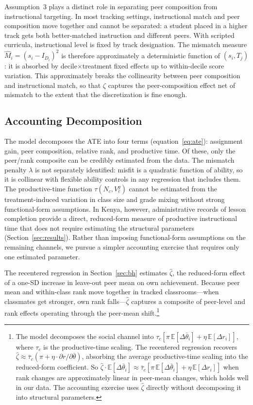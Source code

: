 \documentclass[11pt]{article}
\newcommand{\E}{\mathbb{E}}
\begin{document}
Assumption~3 plays a distinct role in separating peer composition from instructional targeting. In most tracking settings, instructional match and peer composition move together and cannot be separated: a student placed in a higher track gets both better-matched instruction and different peers. With scripted curricula, instructional level is fixed by track designation. The mismatch measure $\hat{M}_i = (s_i - I_{D_i})^2$ is therefore approximately a deterministic function of $(s_i, T_j)$: it is absorbed by decile$\times$treatment fixed effects up to within-decile score variation. This approximately breaks the collinearity between peer composition and instructional match, so that $\zeta$ captures the peer-composition effect net of mismatch to the extent that the discretization is fine enough.


\subsection{Accounting Decomposition}
\label{sec:accounting}

The model decomposes the ATE into four terms (equation~\ref{eq:ate}): assignment gain, peer composition, relative rank, and productive time. Of these, only the peer/rank composite can be credibly estimated from the data. The mismatch penalty $\lambda$ is not separately identified: misfit is a quadratic function of ability, so it is collinear with flexible ability controls in any regression that includes them. The productive-time function $\tau(N_c, V^g_c)$ cannot be estimated from the treatment-induced variation in class size and grade mixing without strong functional-form assumptions. In Kenya, however, administrative records of lesson completion provide a direct, reduced-form measure of productive instructional time that does not require estimating the structural parameters (Section~\ref{sec:results}). Rather than imposing functional-form assumptions on the remaining channels, we pursue a simpler accounting exercise that requires only one estimated parameter.

The recentered regression in Section~\ref{sec:bh} estimates $\hat{\zeta}$, the reduced-form effect of a one-SD increase in leave-out peer mean on own achievement. Because peer mean and within-class rank move together in tracked classrooms---when classmates get stronger, own rank falls---$\hat{\zeta}$ captures a composite of peer-level and rank effects operating through the peer-mean shift.\footnote{The model decomposes the social channel into $\tau_c[\pi\,\E[\Delta\bar{\theta}_i] + \eta\,\E[\Delta r_i]]$, where $\tau_c$ is the productive-time scaling. The recentered regression recovers $\hat{\zeta} \approx \bar{\tau}_c(\pi + \eta \cdot \partial r / \partial \bar{\theta})$, absorbing the average productive-time scaling into the reduced-form coefficient. So $\hat{\zeta} \cdot \E[\Delta\bar{\theta}_i] \approx \bar{\tau}_c[\pi\,\E[\Delta\bar{\theta}_i] + \eta\,\E[\Delta r_i]]$ when rank changes are approximately linear in peer-mean changes, which holds well in our data. The accounting exercise uses $\hat{\zeta}$ directly without decomposing it into structural parameters.}
\end{document}
